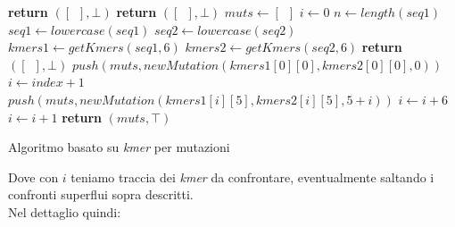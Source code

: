 \documentclass[a4paper,12pt, oneside]{book}
\begin{document}
\begin{algorithm}[H]
  \begin{algorithmic}[1]
    \State \textbf{return} $([\,\,\,],\bot)$
    \EndIf
    \State \textbf{return} $([\,\,\,],\bot)$
    \EndIf
    \State $muts \gets [\,\,\,]$
    \State $i\gets 0$
    \State $n\gets length(seq1)$
    \State $seq1\gets lowercase(seq1)$
    \State $seq2\gets lowercase(seq2)$
    \State $kmers1\gets getKmers(seq1,6)$
    \State $kmers2\gets getKmers(seq2,6)$
    \State \textbf{return} $([\,\,\,],\bot)$
    \EndIf
    \State $push(muts, newMutation(kmers1[0][0], kmers2[0][0], 0))$
    \State $i \gets index+1$
    \EndIf
    \State $push(muts, newMutation(kmers1[i][5], kmers2[i][5], 5+i))$
    \State $i\gets i+6$
    \Else
    \State $i\gets i+1$
    \EndIf
    \EndWhile
    \State \textbf{return} $(muts, \top)$
    \EndFunction
  \end{algorithmic}
  \caption{Algoritmo basato su \textit{kmer} per mutazioni}
\end{algorithm}
\newpage
\noindent
Dove con $i$ teniamo traccia dei \textit{kmer} da confrontare, eventualmente
saltando i confronti superflui sopra descritti.\\
Nel dettaglio quindi:
\end{document}
